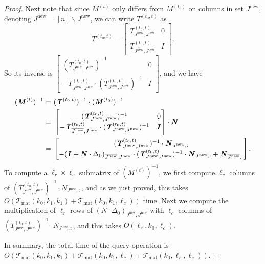 \documentclass[11pt]{article}
\newcommand{\Tmat}{\mathcal{T}_{\mathrm{mat}}}
\newcommand{\new}{\mathrm{new}}
\newcommand\II{\boldsymbol{\mathit{I}}}
\newcommand\NN{\boldsymbol{\mathit{N}}}
\newcommand\MM{\boldsymbol{\mathit{M}}}
\newcommand\TT{\boldsymbol{\mathit{T}}}
\newcommand{\ov}{\overline}
\begin{document}
\begin{proof}
Next note that since $\MM^{(t)}$ only differs from $\MM^{(t_0)}$ on columns in set $J^{\new}$, denoting $\ov{J^{\new}} = [n]\backslash J^{\new}$, we can write $\TT^{(t_0, t)}$ as
\[
\TT^{(t_0, t)} = 
\begin{bmatrix}
\TT^{(t_0, t)}_{J^{\new},J^{\new}} & 0 \\
\TT^{(t_0, t)}_{\ov{J^{\new}},J^{\new}} & \II
\end{bmatrix}.
\]
So its inverse is $\begin{bmatrix}
(\TT^{(t_0, t)}_{J^{\new},J^{\new}})^{-1} & 0 \\
- \TT^{(t_0, t)}_{\overline{J^{\new}},J^{\new}} \cdot (\TT^{(t_0, t)}_{J^{\new},J^{\new}})^{-1} & \II
\end{bmatrix}$, and we have
\begin{align}\label{eq:M_t_inv}
(\MM^{(t)})^{-1} = &~ (\TT^{(t_0, t)})^{-1} \cdot (\MM^{(t_0)})^{-1} \notag \\
= &~ \begin{bmatrix}
(\TT^{(t_0, t)}_{J^{\new},J^{\new}})^{-1} & 0 \\
- \TT^{(t_0, t)}_{\overline{J^{\new}},J^{\new}} \cdot (\TT^{(t_0, t)}_{J^{\new},J^{\new}})^{-1} & \II
\end{bmatrix} 
\cdot \NN \notag \\
= &~ \begin{bmatrix}
(\TT^{(t_0, t)}_{J^{\new},J^{\new}})^{-1} \cdot \NN_{J^{\new}, :} \\
- (\II + \NN \cdot \Delta_0)_{\overline{J^{\new}},J^{\new}} \cdot (\TT^{(t_0, t)}_{J^{\new},J^{\new}})^{-1} \cdot \NN_{J^{\new}, :} + \NN_{\ov{J^{\new}}, :}
\end{bmatrix}.
\end{align}
To compute a $\ell_r \times \ell_c$ submatrix of $(\MM^{(t)})^{-1}$, we first compute $\ell_c$ columns of $(\TT^{(t_0,t)}_{J^{\new},J^{\new}})^{-1} \cdot \NN_{J^{\new},:}$, and as we just proved, this takes $O(\Tmat(k_0, k_1, k_1) + \Tmat(k_0, k_1, \ell_c))$ time. Next we compute the multiplication of $\ell_r$ rows of $(\NN \cdot \Delta_0)_{\overline{J^{\new}},J^{\new}}$ with $\ell_c$ columns of $(\TT^{(t_0,t)}_{J^{\new},J^{\new}})^{-1} \cdot \NN_{J^{\new},:}$, and this takes $O(\ell_r, k_0, \ell_c)$.

In summary, the total time of the query operation is $O(\Tmat(k_0, k_1, k_1) + \Tmat(k_0, k_1, \ell_c) + \Tmat(k_0, \ell_r, \ell_c))$.
\end{proof}
\end{document}
